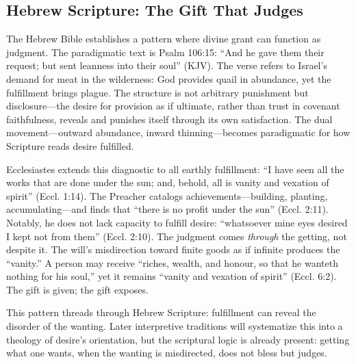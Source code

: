 \subsection*{Hebrew Scripture: The Gift That Judges}
\label{ssec:iii-hebrew-scripture}

The Hebrew Bible establishes a pattern where divine grant can function as judgment. The
paradigmatic text is Psalm 106:15: ``And he gave them their request; but sent leanness into
their soul'' (KJV). The verse refers to Israel's demand for meat in the wilderness: God
provides quail in abundance, yet the fulfillment brings plague. The structure is not arbitrary
punishment but disclosure---the desire for provision as if ultimate, rather than trust in
covenant faithfulness, reveals and punishes itself through its own satisfaction. The dual
movement---outward abundance, inward thinning---becomes paradigmatic for how Scripture reads
desire fulfilled.

Ecclesiastes extends this diagnostic to all earthly fulfillment: ``I have seen all the works
that are done under the sun; and, behold, all is vanity and vexation of spirit'' (Eccl.
1:14). The Preacher catalogs achievements---building, planting, accumulating---and finds that
``there is no profit under the sun'' (Eccl. 2:11). Notably, he does not lack capacity to
fulfill desire: ``whatsoever mine eyes desired I kept not from them'' (Eccl. 2:10). The
judgment comes \emph{through} the getting, not despite it. The will's misdirection toward
finite goods as if infinite produces the ``vanity.'' A person may receive ``riches, wealth,
and honour, so that he wanteth nothing for his soul,'' yet it remains ``vanity and vexation
of spirit'' (Eccl. 6:2). The gift is given; the gift exposes.

This pattern threads through Hebrew Scripture: fulfillment can reveal the disorder of the
wanting. Later interpretive traditions will systematize this into a theology of desire's
orientation, but the scriptural logic is already present: getting what one wants, when the
wanting is misdirected, does not bless but judges.
